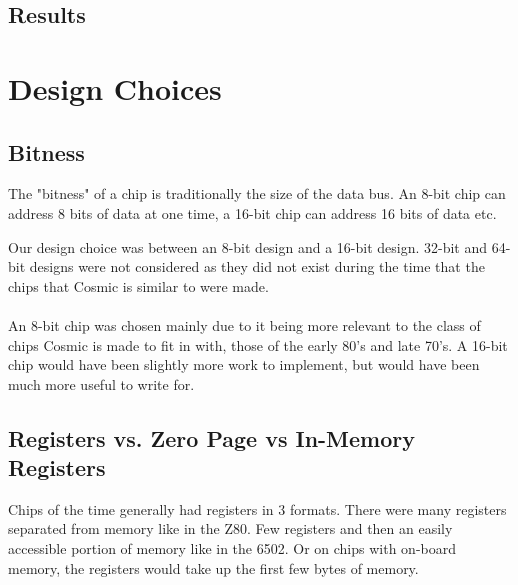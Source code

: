 \documentclass[conference]{IEEEtran}
\begin{document}
\subsection{Results}


\section{Design Choices}
\subsection{Bitness}
The "bitness" of a chip is traditionally the size of the data bus. An 8-bit chip can address 8 bits of data at one time, a 16-bit chip can address 16 bits of data etc.

Our design choice was between an 8-bit design and a 16-bit design. 32-bit and 64-bit designs were not considered as they did not exist during the time that the chips that Cosmic is similar to were made.\\

\\

An 8-bit chip was chosen mainly due to it being more relevant to the class of chips Cosmic is made to fit in with, those of the early 80's and late 70's. A 16-bit chip would have been slightly more work to implement, but would have been much more useful to write for.

\subsection{Registers vs. Zero Page vs In-Memory Registers}

Chips of the time generally had registers in 3 formats. There were many registers separated from memory like in the Z80. Few registers and then an easily accessible portion of memory like in the 6502. Or on chips with on-board memory, the registers would take up the first few bytes of memory.
\end{document}
